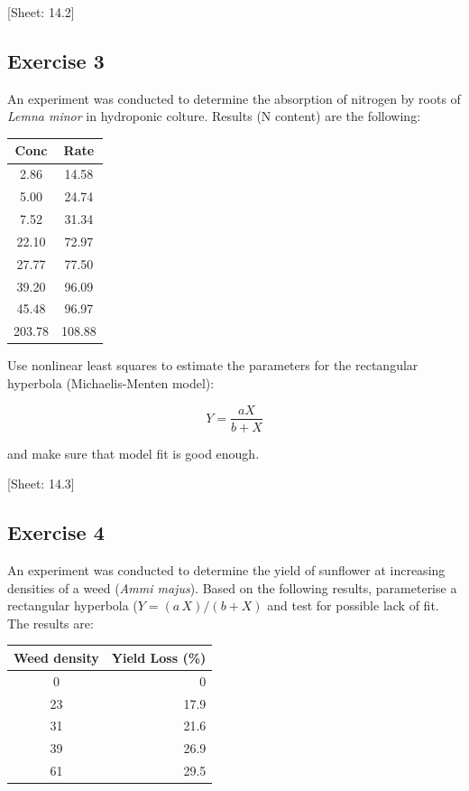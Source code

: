 \documentclass[a4paper,12pt,oneside]{book}
\begin{document}
{[}Sheet: 14.2{]}

\hypertarget{exercise-3-8}{%
\subsection{Exercise 3}\label{exercise-3-8}}

An experiment was conducted to determine the absorption of nitrogen by roots of \emph{Lemna minor} in hydroponic colture. Results (N content) are the following:

\begin{longtable}[]{@{}cc@{}}
\toprule
Conc & Rate \\
\midrule
\endhead
2.86 & 14.58 \\
5.00 & 24.74 \\
7.52 & 31.34 \\
22.10 & 72.97 \\
27.77 & 77.50 \\
39.20 & 96.09 \\
45.48 & 96.97 \\
203.78 & 108.88 \\
\bottomrule
\end{longtable}

Use nonlinear least squares to estimate the parameters for the rectangular hyperbola (Michaelis-Menten model):

\[Y = \frac{a X} {b + X}\]

and make sure that model fit is good enough.

{[}Sheet: 14.3{]}

\hypertarget{exercise-4-5}{%
\subsection{Exercise 4}\label{exercise-4-5}}

An experiment was conducted to determine the yield of sunflower at increasing densities of a weed (\emph{Ammi majus}). Based on the following results, parameterise a rectangular hyperbola (\(Y = (a \, X)/(b + X)\) and test for possible lack of fit. The results are:

\begin{longtable}[]{@{}cr@{}}
\toprule
Weed density & Yield Loss (\%) \\
\midrule
\endhead
0 & 0 \\
23 & 17.9 \\
31 & 21.6 \\
39 & 26.9 \\
61 & 29.5 \\
\bottomrule
\end{longtable}
\end{document}
